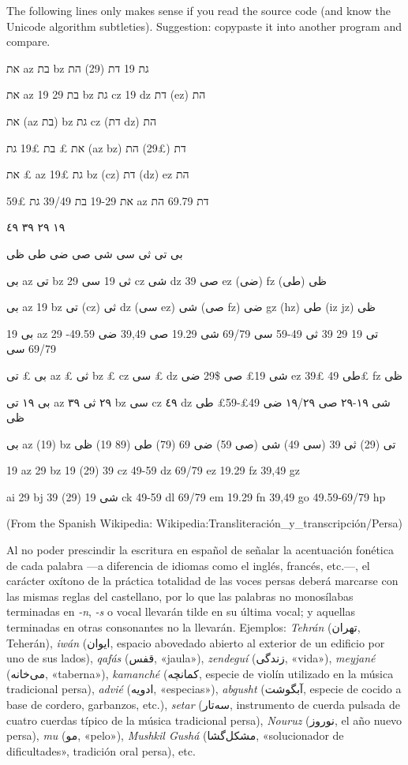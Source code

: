 \documentclass{book}
\begin{document}

\newpage

The following lines only makes sense if you read the source code (and 
know the Unicode algorithm subtleties). Suggestion: copypaste it into 
another program and compare.

\medskip

את az בת bz גת 19 דת (29) הת 

את az 19 בת 29 bz גת cz 19 dz דת (ez) הת 

את (az בת) bz גת cz (דת dz) הת 

את £ בת 19£ גת (az bz) דת (29£) הת 

את £ az 19£ גת bz (cz) דת (dz) ez הת 

את 19-29 בת 39/49 גת 59£ az דת 69.79 הת 

\medskip

١٩ ٢٩ ٣٩ ٤٩ 

بى تى ثى سى شى صى ضى طى ظى

بى az تى bz ثى 19 سى 29 cz شى dz 39 صى ez (ضى) fz (طى) ظى

بى az 19 bz تى (cz) ثى dz (سى ez) شى (صى fz) ضى gz (hz) طى (iz jz) ظى

بى 19 az 29 تى 19 29 39 ثى 49-59 سى 69/79 شى 19.29 صى 39,49 ضى 49.59-69/79 سى

بى £ تى az £ ثى bz £ cz سى £ dz شى 19£ صى \$29 ضى ez 39£ طى 49£ fz ظى

بى ١٩ تى az ٢٩ ثى ٣٩ bz سى cz ٤٩ dz شى ١٩-٢٩ صى ١٩/٢٩ ضى 49£-59£ طى ظى

بى az (19) bz تى (29) ثى 39 (سى 49) شى (صى 59) ضى 69 (79) طى (89 19)
ظى

19 az 29 bz 19 (29) 39 cz 49-59 dz 69/79 ez 19.29 fz 39,49 gz

ai 29 bj شى 19 (29) 39 ck 49-59 dl 69/79 em 19.29 fn 39,49 go
49.59-69/79 hp

\bigskip
{}

(From the Spanish Wikipedia:
Wikipedia:Transliteración\_y\_transcripción/Persa)

Al no poder prescindir la escritura en español de señalar la
acentuación fonética de cada palabra —a diferencia de idiomas como el
inglés, francés, etc.—, el carácter oxítono de la práctica totalidad de
las voces persas deberá marcarse con las mismas reglas del castellano,
por lo que las palabras no monosílabas terminadas en \textit{-n},
\textit{-s} o vocal llevarán tilde en su última vocal; y aquellas
terminadas en otras consonantes no la llevarán. Ejemplos:
\textit{Tehrán} (تهران, Teherán), \textit{iwán} (ایوان, espacio
abovedado abierto al exterior de un edificio por uno de sus lados),
\textit{qafás} (قفس, «jaula»), \textit{zendeguí} (زندگی, «vida»),
\textit{meyjané} (می‌خانه, «taberna»), \textit{kamanché} (کمانچه,
especie de violín utilizado en la música tradicional persa),
\textit{advié} (ادویه, «especias»), \textit{abgusht} (آبگوشت, especie
de cocido a base de cordero, garbanzos, etc.), \textit{setar} (سه‌تار,
instrumento de cuerda pulsada de cuatro cuerdas típico de la música
tradicional persa), \textit{Nouruz} (نوروز, el año nuevo persa),
\textit{mu} (مو, «pelo»),\textit{ Mushkil Gushá} (مشکل‌گشا,
«solucionador de dificultades», tradición oral persa), etc.
\end{document}
